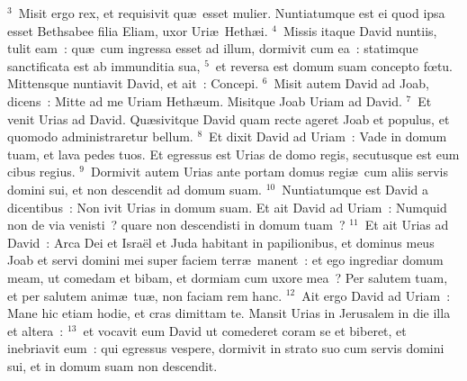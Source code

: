 ${}^{3}$~Misit ergo rex, et requisivit qu\ae\ esset mulier. Nuntiatumque est ei quod ipsa esset Bethsabee filia Eliam, uxor Uri\ae\ Heth\ae i.
${}^{4}$~Missis itaque David nuntiis, tulit eam~: qu\ae\ cum ingressa esset ad illum, dormivit cum ea~: statimque sanctificata est ab immunditia sua,
${}^{5}$~et reversa est domum suam concepto fœtu. Mittensque nuntiavit David, et ait~: Concepi.
${}^{6}$~Misit autem David ad Joab, dicens~: Mitte ad me Uriam Heth\ae um. Misitque Joab Uriam ad David.
${}^{7}$~Et venit Urias ad David. Qu\ae sivitque David quam recte ageret Joab et populus, et quomodo administraretur bellum.
${}^{8}$~Et dixit David ad Uriam~: Vade in domum tuam, et lava pedes tuos. Et egressus est Urias de domo regis, secutusque est eum cibus regius.
${}^{9}$~Dormivit autem Urias ante portam domus regi\ae\ cum aliis servis domini sui, et non descendit ad domum suam.
${}^{10}$~Nuntiatumque est David a dicentibus~: Non ivit Urias in domum suam. Et ait David ad Uriam~: Numquid non de via venisti~? quare non descendisti in domum tuam~?
${}^{11}$~Et ait Urias ad David~: Arca Dei et Isra\"el et Juda habitant in papilionibus, et dominus meus Joab et servi domini mei super faciem terr\ae\ manent~: et ego ingrediar domum meam, ut comedam et bibam, et dormiam cum uxore mea~? Per salutem tuam, et per salutem anim\ae\ tu\ae , non faciam rem hanc.
${}^{12}$~Ait ergo David ad Uriam~: Mane hic etiam hodie, et cras dimittam te. Mansit Urias in Jerusalem in die illa et altera~:
${}^{13}$~et vocavit eum David ut comederet coram se et biberet, et inebriavit eum~: qui egressus vespere, dormivit in strato suo cum servis domini sui, et in domum suam non descendit.


